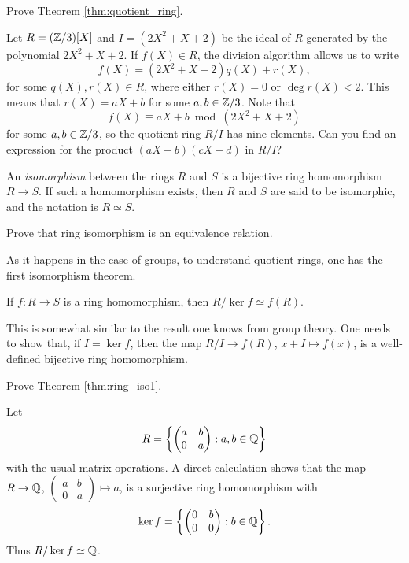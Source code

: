 \begin{exercise}
\label{xca:quotient_ring}
    Prove Theorem \ref{thm:quotient_ring}.
\end{exercise}

\begin{example}
	Let $R=(\mathbb{Z}/3)[X]$ and $I=(2X^2+X+2)$ be the ideal of $R$ 
	generated by the polynomial $2X^2+X+2$. 	If $f(X)\in R$, 
	the division algorithm allows us to write
	\[
	f(X)=(2X^2+X+2)q(X)+r(X),
	\]
	for some $q(X),r(X)\in R$, where either $r(X)=0$ or $\deg r(X)<2$. 
	This means
	that $r(X)=aX+b$ for some $a,b\in\mathbb{Z}/3$.
	Note that
	\[
    f(X)\equiv aX+b\bmod (2X^2+X+2)
    \]
	for some $a,b\in\mathbb{Z}/3$, 
	so the quotient ring $R/I$ has 
	nine elements.  Can you find an expression for the product 
	$(aX+b)(cX+d)$ in $R/I$?
\end{example}

An \emph{isomorphism} between the rings $R$ and $S$ is a bijective
ring homomorphism $R\to S$. If such a homomorphism exists, then $R$ and $S$ are said to be isomorphic, and the notation is 
$R\simeq S$. 

\begin{exercise}
\label{xca:iso}
    Prove that ring isomorphism is an equivalence relation.
\end{exercise}

As it happens in the case of groups, 
to understand quotient rings, one has 
the first isomorphism theorem. 

\begin{theorem}
\label{thm:ring_iso1}
	If $f\colon R\to S$ is a ring homomorphism, then $R/\ker f\simeq f(R)$.  	
\end{theorem}

This is somewhat similar to the result one knows from group theory. 
One needs to show that, if $I=\ker f$, then 
the map $R/I\to f(R)$, $x+I\mapsto f(x)$, is a well-defined 
bijective ring homomorphism. 

\begin{exercise}
\label{xca:first_iso}
    Prove Theorem \ref{thm:ring_iso1}.
\end{exercise}

\begin{example}
Let 
\[
R=\left\{\begin{pmatrix}
a&b\\
0&a
\end{pmatrix}:a,b\in\mathbb{Q}\right\}
\]
with the usual matrix operations. 
A direct calculation shows that the map $R\to\mathbb{Q}$, $\begin{pmatrix}a&b\\0&a\end{pmatrix}\mapsto a$, is a surjective 
ring homomorphism with  
\[
\ker f=\left\{\begin{pmatrix}
0&b\\
0&0\end{pmatrix}:b\in\mathbb{Q}\right\}.
\]
Thus $R/\ker f\simeq\mathbb{Q}$. 	
\end{example}

